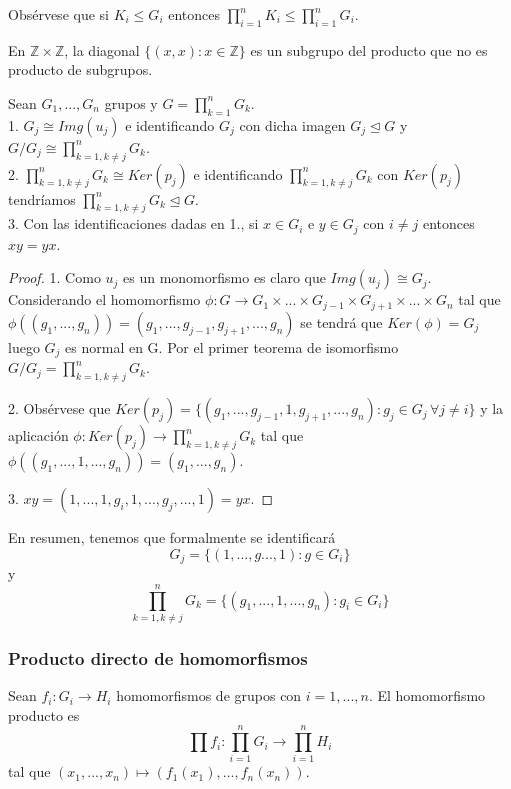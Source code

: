 Obsérvese que si $K_i \le G_i$ entonces $\prod_{i=1}^{n} K_i \le \prod_{i=1}^{n} G_i$.

\begin{ejemplo}
En $\mathbb{Z} \times \mathbb{Z}$, la diagonal $\{(x,x):x \in \mathbb{Z}\}$ es un subgrupo del producto que no es producto de subgrupos.
\end{ejemplo}

\begin{nprop}
Sean $G_1,...,G_n$ grupos y $G = \prod_{k=1}^{n} G_k$. \\
1. $G_j \cong Img(u_j)$ e identificando $G_j$ con dicha imagen $G_j \trianglelefteq G$ y $G/G_j \cong \prod_{k=1,k \neq j}^{n} G_k$. \\
2. $\prod_{k=1,k \neq j}^{n} G_k \cong Ker(p_j)$ e identificando $\prod_{k=1,k \neq j}^{n} G_k$ con $Ker(p_j)$ tendríamos $\prod_{k=1,k \neq j}^{n} G_k \trianglelefteq G$.\\ 
3. Con las identificaciones dadas en 1., si $x \in G_i$ e $y \in G_j$ con $i \neq j$ entonces $xy = yx$.
\end{nprop}
\begin{proof}
1. Como $u_j$ es un monomorfismo es claro que $Img(u_j) \cong G_j$. Considerando el homomorfismo $\phi:G \rightarrow G_1 \times ... \times G_{j-1} \times G_{j+1} \times ... \times G_n$ tal que $\phi((g_1,...,g_n)) = (g_1,...,g_{j-1},g_{j+1},...,g_n)$ se tendrá que $Ker(\phi) = G_j$ luego $G_j$ es normal en G. Por el primer teorema de isomorfismo $G/G_j = \prod_{k=1,k \neq j}^{n} G_k$.

2. Obsérvese que $Ker(p_j) = \{(g_1,...,g_{j-1},1,g_{j+1},...,g_n):g_j \in G_j \, \forall j \neq i\}$ y la aplicación $\phi:Ker(p_j) \rightarrow \prod_{k=1,k \neq j}^{n} G_k$ tal que $\phi((g_1,...,1,...,g_n)) = (g_1,...,g_n)$.

3. $xy = (1,...,1,g_i,1,...,g_j,...,1) = yx$.
\end{proof}

En resumen, tenemos que formalmente se identificará $$G_j = \{(1,...,g...,1):g \in G_i\}$$ y $$\prod_{k=1,k \neq j}^{n} G_k = \{(g_1,...,1,...,g_n):g_i \in G_i\}$$

\subsubsection{Producto directo de homomorfismos}

\begin{ndef}
Sean $f_i:G_i \rightarrow H_i$ homomorfismos de grupos con $i=1,...,n$. El homomorfismo producto es $$\prod f_i:\prod_{i=1}^{n} G_i \rightarrow \prod_{i=1}^{n} H_i$$ tal que $(x_1,...,x_n) \mapsto (f_1(x_1),...,f_n(x_n))$.
\end{ndef}

